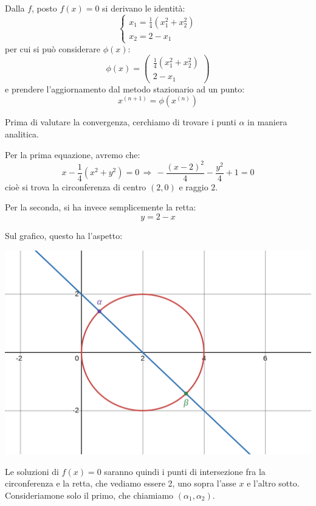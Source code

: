 \documentclass[a4paper,11pt]{article}
\begin{document}
Dalla $f$, posto $f(x) = 0$ si derivano le identità:
\[
	\begin{cases}
		x_1 = \frac{1}{4} (x_1^2 + x_2^2)	\\
		x_2 = 2 - x_1
	\end{cases}
\]
per cui si può considerare $\phi(x)$:
$$
\phi(x) =
\begin{pmatrix}
	\frac{1}{4} (x_1^2 + x_2^2) \\
	2 - x_1
\end{pmatrix}
$$
e 
prendere l'aggiornamento dal metodo stazionario ad un punto:
$$
x^{(n + 1)} = \phi(x^{(n)})
$$

\par\smallskip

Prima di valutare la convergenza, cerchiamo di trovare i punti $\alpha$ in maniera analitica.

Per la prima equazione, avremo che:
$$
x - \frac{1}{4} (x^2 + y^2) = 0 \, \Rightarrow \, - \frac{(x - 2)^2}{4} - \frac{y^2}{4} + 1 = 0
$$
cioè si trova la circonferenza di centro $(2, 0)$ e raggio $2$.

Per la seconda, si ha invece semplicemente la retta:
$$
y = 2 - x
$$

Sul grafico, questo ha l'aspetto:
\begin{center}
	\includegraphics[scale=0.3]{../figures/nonlin.png}
\end{center}

Le soluzioni di $f(x) = 0$ saranno quindi i punti di intersezione fra la circonferenza e la retta, che vediamo essere 2, uno sopra l'asse $x$ e l'altro sotto.
Consideriamone solo il primo, che chiamiamo $(\alpha_1, \alpha_2)$.

\par\smallskip
\end{document}
